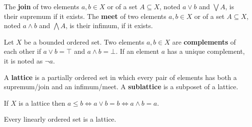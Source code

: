 \documentclass{bareminimum}
\begin{document}
\begin{defn}
	The \textbf{join}  of two elements $a, b \in X$ or of a set $A \subseteq X$, noted $a \vee b$ and $\bigvee A$, is their supremum if it exists. The \textbf{meet} of two elements $a, b \in X$ or of a set $A \subseteq X$, noted $a \wedge b$ and $\bigwedge A$, is their infimum, if it exists.
\end{defn}


\begin{defn}[Complement]
	Let $X$ be  a bounded ordered set. Two elements $a, b \in X$ are \textbf{complements} of each other if $a \vee b = \top$ and $a \wedge b = \bot$. If an element $a$ has a unique complement, it is noted as $\neg a$.
\end{defn}

\begin{defn}
	A \textbf{lattice}  is a partially ordered set in which every pair of elements has both a supremum/join and an infimum/meet. A \textbf{sublattice} is a subposet of a lattice.
\end{defn}

\begin{prop}
	If $X$ is a lattice then $a \leq b \iff a \vee b = b \iff a \wedge b = a$.
\end{prop}

\begin{prop}
	Every linearly ordered set is a lattice.
\end{prop}
\end{document}
